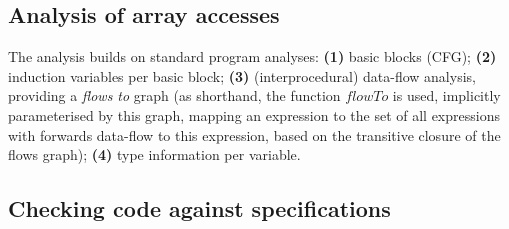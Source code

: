 \subsection{Analysis of array accesses}
\label{subsec:analysis}

\newcommand{\neigh}{\textsf{neigh}}

The analysis builds on standard program analyses:
%
\textbf{(1)} basic blocks (CFG);
\textbf{(2)} induction variables per basic block;
\textbf{(3)} (interprocedural) data-flow analysis, providing a \emph{flows to}
  graph (as shorthand, the function
  $\mathit{flowTo}$ is used, implicitly parameterised by this graph,
  mapping an expression to the set of all expressions
  with forwards data-flow to this expression, based on the transitive
  closure of the flows graph);
\textbf{(4)} type information per variable.%


\subsection{Checking code against specifications}
\label{subsec:checking}

